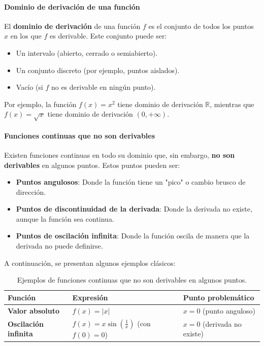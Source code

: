 \documentclass[12pt, a4paper]{article}
\theoremstyle{rioplatense}
\begin{document}
\paragraph{Dominio de derivación de una función}
El \textbf{dominio de derivación} de una función \( f \) es el conjunto de todos los puntos \( x \) en los que \( f \) es derivable. Este conjunto puede ser:
\begin{itemize}
    \item Un intervalo (abierto, cerrado o semiabierto).
    \item Un conjunto discreto (por ejemplo, puntos aislados).
    \item Vacío (si \( f \) no es derivable en ningún punto).
\end{itemize}

Por ejemplo, la función \( f(x) = x^2 \) tiene dominio de derivación \( \mathbb{R} \), mientras que \( f(x) = \sqrt{x} \) tiene dominio de derivación \( (0, +\infty) \).

\paragraph{Funciones continuas que no son derivables}
Existen funciones continuas en todo su dominio que, sin embargo, \textbf{no son derivables} en algunos puntos. Estos puntos pueden ser:
\begin{itemize}
    \item \textbf{Puntos angulosos}: Donde la función tiene un "pico" o cambio brusco de dirección.
    \item \textbf{Puntos de discontinuidad de la derivada}: Donde la derivada no existe, aunque la función sea continua.
    \item \textbf{Puntos de oscilación infinita}: Donde la función oscila de manera que la derivada no puede definirse.
\end{itemize}

A continuación, se presentan algunos ejemplos clásicos:

\begin{table}[h]
\centering
\footnotesize
\begin{tabular}{lll}
\hline
\textbf{Función} & \textbf{Expresión} & \textbf{Punto problemático} \\
\hline
\textbf{Valor absoluto} & \( f(x) = |x| \) & \( x = 0 \) (punto anguloso) \\
\textbf{Oscilación infinita} & \( f(x) = x \sin\left(\frac{1}{x}\right) \) (con \( f(0) = 0 \)) & \( x = 0 \) (derivada no existe) \\
\hline
\end{tabular}
\caption{Ejemplos de funciones continuas que no son derivables en algunos puntos.}
\end{table}
\end{document}
